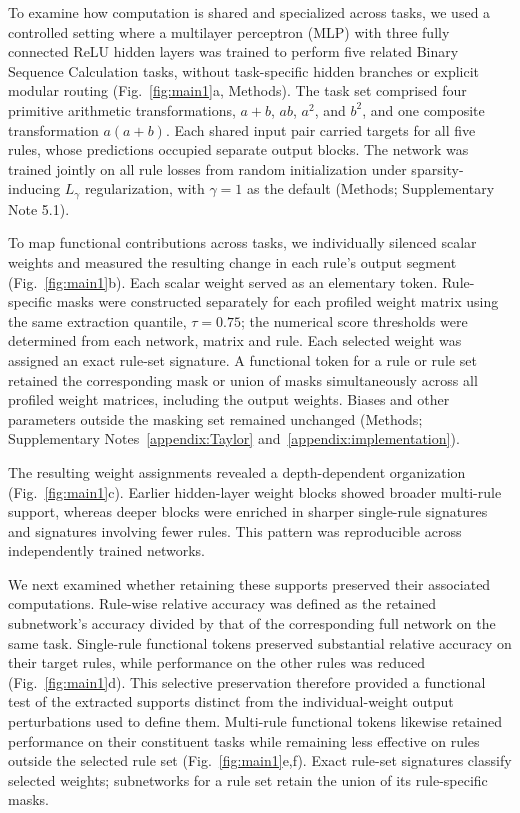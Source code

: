 \documentclass{article}
\begin{document}
To examine how computation is shared and specialized across tasks, we used a controlled setting where a multilayer perceptron (MLP) with three fully connected ReLU hidden layers was trained to perform five related Binary Sequence Calculation tasks, without task-specific hidden branches or explicit modular routing (Fig.~\ref{fig:main1}a, Methods). The task set comprised four primitive arithmetic transformations, \(a + b\), \(ab\), \(a^{2}\), and \(b^{2}\), and one composite transformation \(a(a + b)\). Each shared input pair carried targets for all five rules, whose predictions occupied separate output blocks. The network was trained jointly on all rule losses from random initialization under sparsity-inducing \(L_{\gamma}\) regularization, with \(\gamma = 1\) as the default (Methods; Supplementary Note 5.1).

To map functional contributions across tasks, we individually silenced scalar weights and measured the resulting change in each rule's output segment (Fig.~\ref{fig:main1}b). Each scalar weight served as an elementary token. Rule-specific masks were constructed separately for each profiled weight matrix using the same extraction quantile, $\tau=0.75$; the numerical score thresholds were determined from each network, matrix and rule. Each selected weight was assigned an exact rule-set signature. A functional token for a rule or rule set retained the corresponding mask or union of masks simultaneously across all profiled weight matrices, including the output weights. Biases and other parameters outside the masking set remained unchanged (Methods; Supplementary Notes~\ref{appendix:Taylor} and~\ref{appendix:implementation}).

The resulting weight assignments revealed a depth-dependent organization (Fig.~\ref{fig:main1}c). Earlier hidden-layer weight blocks showed broader multi-rule support, whereas deeper blocks were enriched in sharper single-rule signatures and signatures involving fewer rules. This pattern was reproducible across independently trained networks.

We next examined whether retaining these supports preserved their associated computations. Rule-wise relative accuracy was defined as the retained subnetwork's accuracy divided by that of the corresponding full network on the same task. Single-rule functional tokens preserved substantial relative accuracy on their target rules, while performance on the other rules was reduced (Fig.~\ref{fig:main1}d). This selective preservation therefore provided a functional test of the extracted supports distinct from the individual-weight output perturbations used to define them. Multi-rule functional tokens likewise retained performance on their constituent tasks while remaining less effective on rules outside the selected rule set (Fig.~\ref{fig:main1}e,f). Exact rule-set signatures classify selected weights; subnetworks for a rule set retain the union of its rule-specific masks.
\end{document}
